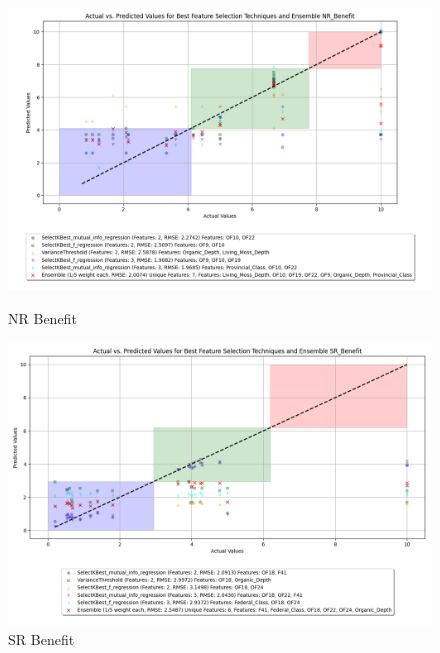 \begin{figure}[H]
    \centering
    \begin{minipage}{0.45\textwidth}
        \centering
        \includegraphics[width=\linewidth]{reg_section_specxtra/images_reg_featred_ensemble/actual_vs_predicted_smallest_feature_selection_and_ensemble_NR_Benefit.png}
        \caption{NR Benefit}
        \label{fig_reg_specxtra:nr_ben_reg_featred_smallest_ensemble}
    \end{minipage}\hfill
    \begin{minipage}{0.45\textwidth}
        \centering
        \includegraphics[width=\linewidth]{reg_section_specxtra/images_reg_featred_ensemble/actual_vs_predicted_smallest_feature_selection_and_ensemble_SR_Benefit.png}
        \caption{SR Benefit}
        \label{fig_reg_specxtra:sr_ben_reg_featred_smallest_ensemble}
    \end{minipage}
\end{figure}

